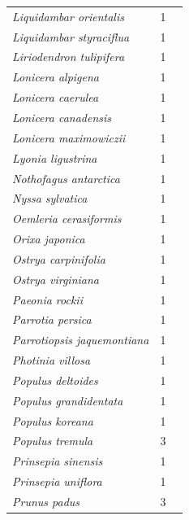 \documentclass[11pt]{article}
\begin{document}
\begin{longtable}{p{}p{}p{}}
  \emph{Liquidambar orientalis} &   1 & \emph{\citep{zohner2016}} \\ 
  \emph{Liquidambar styraciflua} &   1 & \emph{\citep{zohner2016}} \\ 
  \emph{Liriodendron tulipifera} &   1 & \emph{\citep{zohner2016}} \\ 
  \emph{Lonicera alpigena} &   1 & \emph{\citep{zohner2016}} \\ 
  \emph{Lonicera caerulea} &   1 & \emph{\citep{zohner2016}} \\ 
  \emph{Lonicera canadensis} &   1 & \emph{\citep{flynn2018}} \\ 
  \emph{Lonicera maximowiczii} &   1 & \emph{\citep{zohner2016}} \\ 
  \emph{Lyonia ligustrina} &   1 & \emph{\citep{flynn2018}} \\ 
  \emph{Nothofagus antarctica} &   1 & \emph{\citep{zohner2016}} \\ 
  \emph{Nyssa sylvatica} &   1 & \emph{\citep{flynn2018}} \\ 
  \emph{Oemleria cerasiformis} &   1 & \emph{\citep{zohner2016}} \\ 
  \emph{Orixa japonica} &   1 & \emph{\citep{zohner2016}} \\ 
  \emph{Ostrya carpinifolia} &   1 & \emph{\citep{zohner2016}} \\ 
  \emph{Ostrya virginiana} &   1 & \emph{\citep{zohner2016}} \\ 
  \emph{Paeonia rockii} &   1 & \emph{\citep{zohner2016}} \\ 
  \emph{Parrotia persica} &   1 & \emph{\citep{zohner2016}} \\ 
  \emph{Parrotiopsis jaquemontiana} &   1 & \emph{\citep{zohner2016}} \\ 
  \emph{Photinia villosa} &   1 & \emph{\citep{zohner2016}} \\ 
  \emph{Populus deltoides} &   1 & \emph{\citep{Thielges:1976aa}} \\ 
  \emph{Populus grandidentata} &   1 & \emph{\citep{flynn2018}} \\ 
  \emph{Populus koreana} &   1 & \emph{\citep{zohner2016}} \\ 
  \emph{Populus tremula} &   3 & \emph{\citep{Heide:1993,Laube:2014a,Laube:2014b}} \\ 
  \emph{Prinsepia sinensis} &   1 & \emph{\citep{zohner2016}} \\ 
  \emph{Prinsepia uniflora} &   1 & \emph{\citep{zohner2016}} \\ 
  \emph{Prunus padus} &   3 & \emph{\citep{Heide:1993,Myking:1998aa,zohner2016}} \\ 

\end{longtable}
\end{document}
